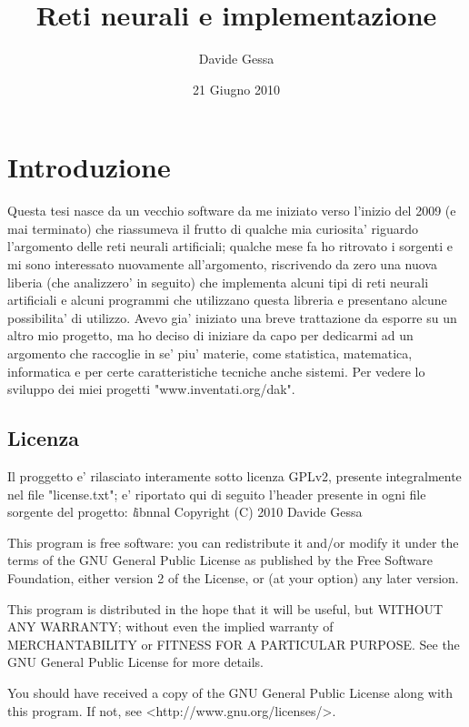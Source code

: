\documentclass[a4paper,10pt]{report}
\title{Reti neurali e implementazione}
\author{Davide Gessa}
\date{21 Giugno 2010}
\begin{document}
\maketitle

\tableofcontents
\setcounter{tocdepth}{4}
\listoffigures

\chapter{Introduzione}
Questa tesi nasce da un vecchio software da me iniziato verso l'inizio del 2009 (e
mai terminato) che riassumeva il frutto di qualche mia curiosita' riguardo 
l'argomento delle reti neurali artificiali; qualche mese fa ho ritrovato i sorgenti 
e mi sono 
interessato nuovamente all'argomento, riscrivendo da zero una nuova liberia (che analizzero' 
in seguito) che implementa alcuni tipi di reti neurali artificiali e alcuni programmi
che utilizzano questa libreria e presentano alcune possibilita' di utilizzo. 
Avevo gia' iniziato una breve trattazione da esporre su un altro mio
progetto, ma ho deciso di iniziare da capo per dedicarmi ad un argomento che
raccoglie in se' piu' materie, come statistica, matematica, informatica e per certe
caratteristiche tecniche anche sistemi.
Per vedere lo sviluppo dei miei progetti "www.inventati.org/dak".

\section{Licenza}
Il proggetto e' rilasciato interamente sotto licenza GPLv2, presente integralmente
nel file "license.txt"; e' riportato qui di 
seguito l'header presente in ogni file sorgente del progetto:
\newline
\newline 
\ttfamily
\textit
    libnnal
    Copyright (C) 2010 Davide Gessa
    
    This program is free software: you can redistribute it and/or modify
    it under the terms of the GNU General Public License as published by
    the Free Software Foundation, either version 2 of the License, or
    (at your option) any later version.

    This program is distributed in the hope that it will be useful,
    but WITHOUT ANY WARRANTY; without even the implied warranty of
    MERCHANTABILITY or FITNESS FOR A PARTICULAR PURPOSE.  See the
    GNU General Public License for more details.

    You should have received a copy of the GNU General Public License
    along with this program.  If not, see <http://www.gnu.org/licenses/>.
\rmfamily
\newline
\end{document}
